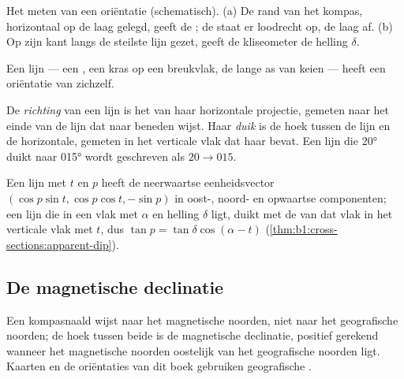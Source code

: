 \begin{omfigure}
{\small Het meten van een oriëntatie (schematisch). (a) De rand van het kompas, horizontaal op de laag gelegd, geeft de ;
de  staat er loodrecht op, de laag af. (b) Op zijn kant langs de steilste lijn gezet, geeft de kliseometer de
helling $\delta$.}
\end{omfigure}

Een lijn --- een , een kras op een breukvlak, de lange as van keien --- heeft een oriëntatie van zichzelf.

\begin{definition}\label{def:b1:field-lab-methods-1:trend-plunge}
De \emph{richting} van een lijn is het  van haar horizontale projectie, gemeten
naar het einde van de lijn dat naar beneden wijst. Haar \emph{duik} is de hoek tussen de lijn en de
horizontale, gemeten in het verticale vlak dat haar bevat. Een lijn die \ang{20} duikt naar \ang{015} wordt geschreven
als $20\to015$.
\end{definition}

Een lijn met  $t$ en  $p$ heeft de neerwaartse eenheidsvector $(\cos p\sin t, \cos p\cos t, -\sin p)$ in
oost-, noord- en opwaartse componenten; een lijn die in een vlak met  $\alpha$ en helling $\delta$ ligt,
duikt met de  van dat vlak in het verticale vlak met  $t$, dus $\tan p = \tan\delta\cos(\alpha - t)$
(\cref{thm:b1:cross-sections:apparent-dip}).

\subsection{De magnetische declinatie}

Een kompasnaald wijst naar het magnetische noorden, niet naar het geografische noorden; de hoek tussen beide is de
magnetische declinatie, positief gerekend wanneer het magnetische noorden oostelijk van het geografische noorden ligt.
Kaarten en de oriëntaties van dit boek gebruiken geografische .

